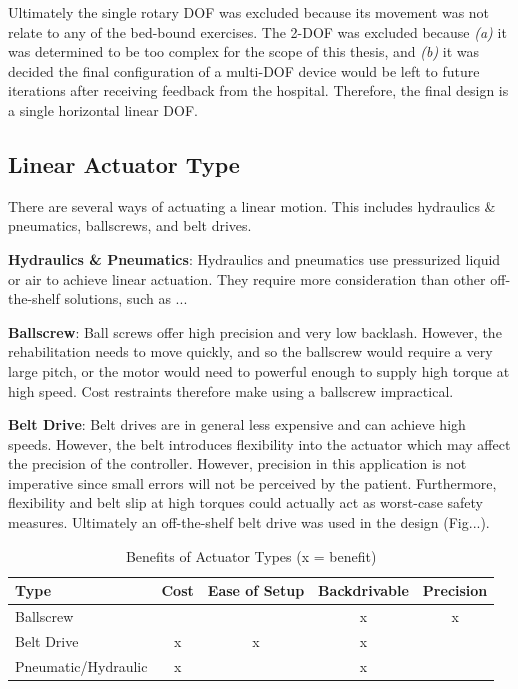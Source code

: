 \documentclass[12pt]{report}
\begin{document}
		Ultimately the single rotary DOF was excluded because its movement was not relate to any of the bed-bound exercises. The 2-DOF was excluded because \textit{(a)} it was determined to be too complex for the scope of this thesis, and \textit{(b)} it was decided the final configuration of a multi-DOF device would be left to future iterations after receiving feedback from the hospital. Therefore, the final design is a single horizontal linear DOF. 

					
		\subsection{Linear Actuator Type}

	There are several ways of actuating a linear motion. This includes hydraulics \& pneumatics, ballscrews, and belt drives.
	
	\textbf{Hydraulics \& Pneumatics}: Hydraulics and pneumatics use pressurized liquid or air to achieve linear actuation. They require more consideration than other off-the-shelf solutions, such as ...


	\textbf{Ballscrew}: Ball screws offer high precision and very low backlash. However, the rehabilitation needs to move quickly, and so the ballscrew would require a very large pitch, or the motor would need to powerful enough to supply high torque at high speed. Cost restraints therefore make using a ballscrew impractical. 
	
	\textbf{Belt Drive}: Belt drives are in general less expensive and can achieve high speeds. However, the belt introduces flexibility into the actuator which may affect the precision of the controller. However, precision in this application is not imperative since small errors will not be perceived by the patient. Furthermore, flexibility and belt slip at high torques could actually act as worst-case safety measures. Ultimately an off-the-shelf belt drive was used in the design (Fig...).


	
	\begin{table}[]
	\centering
	\caption{Benefits of Actuator Types (x = benefit)}	
	\begin{tabular}{|l|c|c|c|c|}
		\hline
		\textbf{Type} & \textbf{Cost} & \textbf{Ease of Setup} & 		\textbf{Backdrivable} & \textbf{Precision} \\ \hline
		Ballscrew &  &  & x & x \\ \hline
		Belt Drive & x & x & x & \\ \hline
		Pneumatic/Hydraulic & x &  & x & \\ \hline
		\end{tabular}
	\label{tab:actuator}
	\end{table}
				
\end{document}
